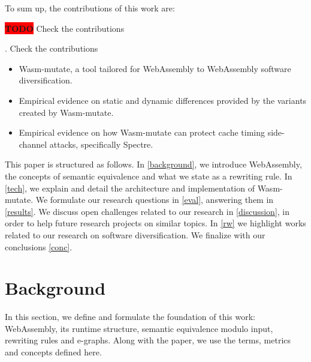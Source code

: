 \documentclass[sigplan,screen]{acmart}
\newcommand*\badge[1]{ \colorbox{red}{\color{white}#1}}
\newcommand{\tool}{Wasm-mutate\xspace}
\newcommand{\todo}[1]{%
\refstepcounter{todo}
\noindent\textbf{\badge{TODO}} {\color{red}#1}
\addcontentsline{td}{todo}
{\color{red}\thesection.\thetodo\xspace #1}}
\begin{document}



To sum up, the contributions of this work are:

\todo{Check the contributions}
\begin{itemize}
    \item \tool, a tool tailored for WebAssembly to WebAssembly software diversification.
    \item Empirical evidence on static and dynamic differences provided by the variants created by \tool.
    \item Empirical evidence on how \tool can protect cache timing side-channel attacks, specifically Spectre.
    
\end{itemize}

This paper is structured as follows. 
In \autoref{background}, we introduce WebAssembly, the concepts of semantic equivalence and what we state as a rewriting rule.
In \autoref{tech}, we explain and detail the architecture and implementation of \tool.
We formulate our research questions in \autoref{eval}, answering them in \autoref{results}.
We discuss open challenges related to our research in \autoref{discussion}, in order to help future research projects on similar topics.
In \autoref{rw} we highlight works related to our research on software diversification.
We finalize with our conclusions \autoref{conc}.

\section{Background}
\label{background}

In this section, we define and formulate the foundation of this work: WebAssembly, its runtime structure, semantic equivalence modulo input, rewriting rules and e-graphs.
Along with the paper, we use the terms, metrics and concepts defined here.
\end{document}

